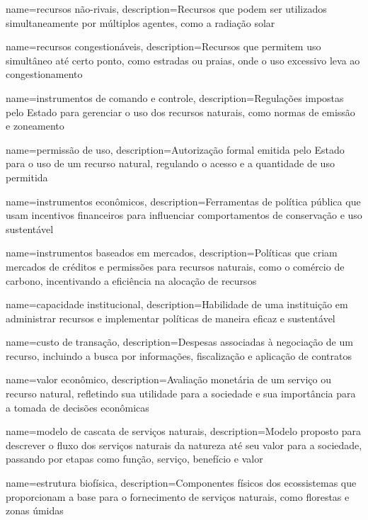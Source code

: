 {
	name=recursos não-rivais,
	description={Recursos que podem ser utilizados simultaneamente por múltiplos agentes, como a radiação solar}
}

{
	name=recursos congestionáveis,
	description={Recursos que permitem uso simultâneo até certo ponto, como estradas ou praias, onde o uso excessivo leva ao congestionamento}
}

{
	name=instrumentos de comando e controle,
	description={Regulações impostas pelo Estado para gerenciar o uso dos recursos naturais, como normas de emissão e zoneamento}
}

{
	name=permissão de uso,
	description={Autorização formal emitida pelo Estado para o uso de um recurso natural, regulando o acesso e a quantidade de uso permitida}
}

{
	name=instrumentos econômicos,
	description={Ferramentas de política pública que usam incentivos financeiros para influenciar comportamentos de conservação e uso sustentável}
}

{
	name=instrumentos baseados em mercados,
	description={Políticas que criam mercados de créditos e permissões para recursos naturais, como o comércio de carbono, incentivando a eficiência na alocação de recursos}
}

{
	name=capacidade institucional,
	description={Habilidade de uma instituição em administrar recursos e implementar políticas de maneira eficaz e sustentável}
}

{
	name=custo de transação,
	description={Despesas associadas à negociação de um recurso, incluindo a busca por informações, fiscalização e aplicação de contratos}
}

{
	name=valor econômico,
	description={Avaliação monetária de um serviço ou recurso natural, refletindo sua utilidade para a sociedade e sua importância para a tomada de decisões econômicas}
}

{
	name=modelo de cascata de serviços naturais,
	description={Modelo proposto para descrever o fluxo dos serviços naturais da natureza até seu valor para a sociedade, passando por etapas como função, serviço, benefício e valor}
}

{
	name=estrutura biofísica,
	description={Componentes físicos dos ecossistemas que proporcionam a base para o fornecimento de serviços naturais, como florestas e zonas úmidas}
}

